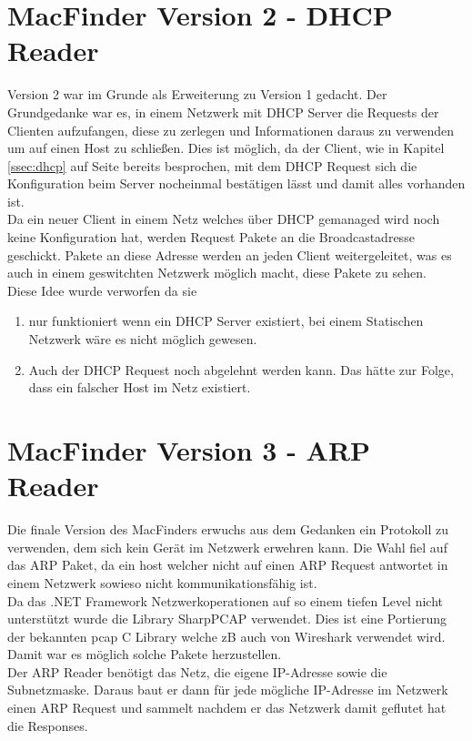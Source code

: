 \documentclass[12pt,a4paper]{report}
\begin{document}
\section{MacFinder Version 2 - DHCP Reader}
Version 2 war im Grunde als Erweiterung zu Version 1 gedacht. Der Grundgedanke war es, in einem Netzwerk mit DHCP Server die Requests der Clienten aufzufangen, diese zu zerlegen und Informationen daraus zu verwenden um auf einen Host zu schließen. Dies ist möglich, da der Client, wie in Kapitel \ref{ssec:dhcp} auf Seite \pageref{ssec:dhcp} bereits besprochen, mit dem DHCP Request sich die Konfiguration beim Server nocheinmal bestätigen lässt und damit alles vorhanden ist.\\
Da ein neuer Client in einem Netz welches über DHCP gemanaged wird noch keine Konfiguration hat, werden Request Pakete an die Broadcastadresse geschickt. Pakete an diese Adresse werden an jeden Client weitergeleitet, was es auch in einem geswitchten Netzwerk möglich macht, diese Pakete zu sehen.\\

Diese Idee wurde verworfen da sie
\begin{enumerate}
\item nur funktioniert wenn ein DHCP Server existiert, bei einem Statischen Netzwerk wäre es nicht möglich gewesen.
\item Auch der DHCP Request noch abgelehnt werden kann. Das hätte zur Folge, dass ein falscher Host im Netz existiert.
\end{enumerate}

\section{MacFinder Version 3 - ARP Reader}
Die finale Version des MacFinders erwuchs aus dem Gedanken ein Protokoll zu verwenden, dem sich kein Gerät im Netzwerk erwehren kann. Die Wahl fiel auf das ARP Paket, da ein host welcher nicht auf einen ARP Request antwortet in einem Netzwerk sowieso nicht kommunikationsfähig ist.\\
Da das .NET Framework Netzwerkoperationen auf so einem tiefen Level nicht unterstützt wurde die Library SharpPCAP verwendet. Dies ist eine Portierung der bekannten pcap C Library welche zB auch von Wireshark verwendet wird. Damit war es möglich solche Pakete herzustellen.\\
Der ARP Reader benötigt das Netz, die eigene IP-Adresse sowie die Subnetzmaske. Daraus baut er dann für jede mögliche IP-Adresse im Netzwerk einen ARP Request und sammelt nachdem er das Netzwerk damit geflutet hat die Responses.\\
\end{document}
